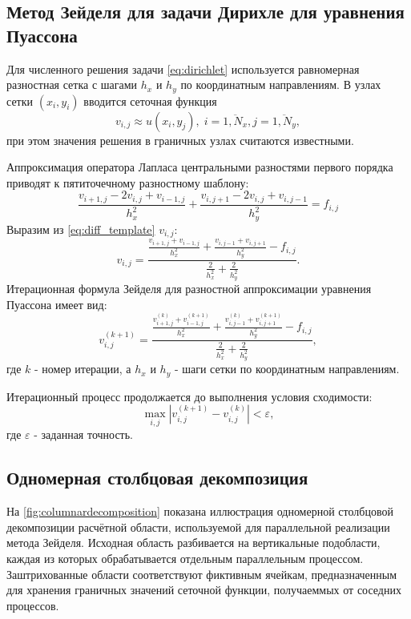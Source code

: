 \subsection{Метод Зейделя для задачи Дирихле для уравнения Пуассона}
Для численного решения задачи \eqref{eq:dirichlet} используется равномерная разностная сетка с шагами $h_x$ и $h_y$ по координатным направлениям. В узлах сетки $(x_i, y_i)$ вводится сеточная функция 
\[
v_{i, j} \approx u(x_i, y_j), \; i = \overline{1, N_x}, j = \overline{1, N_y},
\]
при этом значения решения в граничных узлах считаются известными.

Аппроксимация оператора Лапласа центральными разностями первого порядка приводят к пятиточечному разностному шаблону:
\begin{equation}
	\label{eq:diff_template}
	\frac{v_{i + 1, j} - 2v_{i, j} + v_{i - 1, j}}{h_x^2} + \frac{v_{i, j + 1} - 2v_{i, j} + v_{i, j - 1}}{h_y^2} = f_{i, j}
\end{equation}
Выразим из \eqref{eq:diff_template} $v_{i, j}$:
\begin{equation*}
	v_{i, j} = \frac{\frac{v_{i + 1, j} + v_{i - 1, j}}{h_x^2} + \frac{v_{i, j - 1} + v_{i, j + 1}}{h_y^2} - f_{i, j}}{\frac{2}{h_x^2} + \frac{2}{h_y^2}}.
\end{equation*}
Итерационная формула Зейделя для разностной аппроксимации уравнения Пуассона имеет вид:
\begin{equation}
	\label{eq:Seidel}
	v_{i, j}^{(k + 1)} = \frac{\frac{v_{i + 1, j}^{(k)} + v_{i - 1, j}^{(k + 1)}}{h_x^2} + \frac{v_{i, j - 1}^{(k)} + v_{i, j + 1}^{(k + 1)}}{h_y^2} - f_{i, j}}{\frac{2}{h_x^2} + \frac{2}{h_y^2}},
\end{equation}
где $k$ - номер итерации, а $h_x$ и $h_y$ - шаги сетки по координатным направлениям.

Итерационный процесс продолжается до выполнения условия сходимости:
\[
\max_{i, j} \left| v_{i, j}^{(k + 1)} -v_{i, j}^{(k)} \right| < \varepsilon,
\]
где $\varepsilon$ - заданная точность.
\subsection{Одномерная столбцовая декомпозиция}
На \autoref{fig:columnardecomposition} показана иллюстрация одномерной столбцовой декомпозиции расчётной области, используемой для параллельной реализации метода Зейделя. Исходная область  разбивается на вертикальные подобласти, каждая из которых обрабатывается отдельным параллельным процессом. Заштрихованные области соответствуют фиктивным ячейкам, предназначенным для хранения граничных значений сеточной функции, получаеммых от соседних процессов.

